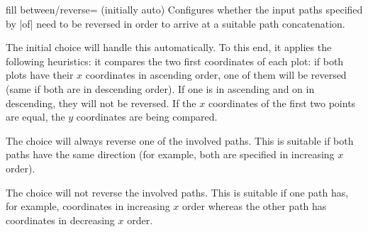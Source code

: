 \begin{pgfplotskey}{fill between/reverse= (initially auto)}
	Configures whether the input paths specified by |of| need to be reversed in order to arrive at a suitable path concatenation.

	The initial choice  will handle this automatically. To this end, it applies the following heuristics: it compares the two first coordinates of each plot: if both plots have their $x$ coordinates in ascending order, one of them will be reversed (same if both are in descending order). If one is in ascending and on in descending, they will not be reversed. If the $x$ coordinates of the first two points are equal, the $y$ coordinates are being compared.

	The choice  will always reverse one of the involved paths. This is suitable if both paths have the same direction (for example, both are specified in increasing $x$ order).

	The choice  will not reverse the involved paths. This is suitable if one path has, for example, coordinates in increasing $x$ order whereas the other path has coordinates in decreasing $x$ order.
\end{pgfplotskey}

\endgroup
